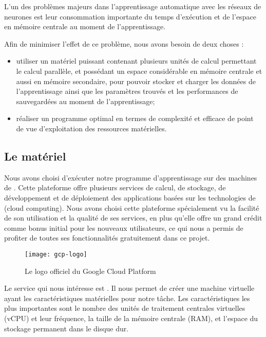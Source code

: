 L'un des problèmes majeurs dans l'apprentissage automatique avec les réseaux
de neurones est leur consommation importante du temps d'exécution et de l'espace
en mémoire centrale au moment de l'apprentissage.

Afin de minimiser l'effet de ce problème, nous avons besoin de deux choses :

\begin{itemize}
  \item utiliser un matériel puissant contenant plusieurs unités de calcul
  permettant le calcul parallèle, et possédant un espace considérable en mémoire
  centrale et aussi en mémoire secondaire, pour pouvoir stocker et charger les
  données de l'apprentissage ainsi que les paramètres trouvés et les performances
  de sauvegardées au moment de l'apprentissage;
  \item réaliser un programme optimal en termes de complexité et efficace de
  point de vue d'exploitation des ressources matérielles.
\end{itemize}

\subsection{Le matériel}

Nous avons choisi d'exécuter notre programme d'apprentissage sur des machines de
. Cette plateforme offre plusieurs services de calcul, de stockage,
de développement et de déploiement des applications basées sur les technologies
de  (cloud computing). Nous avons choisi cette plateforme spécialement vu la facilité
de son utilisation et la qualité de ses services, en plus qu'elle offre un grand crédit
comme bonus initial pour les nouveaux utilisateurs, ce qui nous a permis de profiter de toutes ses
fonctionnalités gratuitement dans ce projet.

\begin{figure}[h]
  \centering
  \texttt{[image: gcp-logo]}
  \caption[Le logo officiel du Google Cloud Platform]{Le logo officiel du Google Cloud Platform \cite{gcp}}
\end{figure}

Le service qui nous intéresse est . Il nous permet de
créer une machine virtuelle ayant les caractéristiques matérielles pour notre tâche.
Les caractéristiques les plus importantes sont le nombre des unités de traitement
centrales virtuelles (vCPU) et leur fréquence, la taille de la mémoire centrale
(RAM), et l'espace du stockage permanent dans le disque dur.

